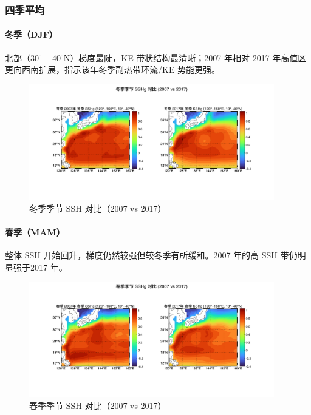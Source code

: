 \documentclass[UTF8]{article}
\begin{document}
\subsubsection{四季平均}
\paragraph{冬季（DJF）}北部（$30^\circ\!-\!40^\circ\mathrm{N}$）梯度最陡，KE 带状结构最清晰；2007 年相对 2017 年高值区更向西南扩展，指示该年冬季副热带环流/KE 势能更强。
\begin{figure}[H]
    \centering
    \includegraphics[width=0.95\textwidth]{SSHg_DJF_2007vs2017.png}
    \caption{冬季季节 SSH 对比（2007 vs 2017）}
    \label{fig:sshg_djf}
\end{figure}

\paragraph{春季（MAM）}整体 SSH 开始回升，梯度仍然较强但较冬季有所缓和。2007 年的高 SSH 带仍明显强于2017 年。
\begin{figure}[H]
    \centering
    \includegraphics[width=0.95\textwidth]{SSHg_MAM_2007vs2017.png}
    \caption{春季季节 SSH 对比（2007 vs 2017）}
    \label{fig:sshg_mam}
\end{figure}
\end{document}
